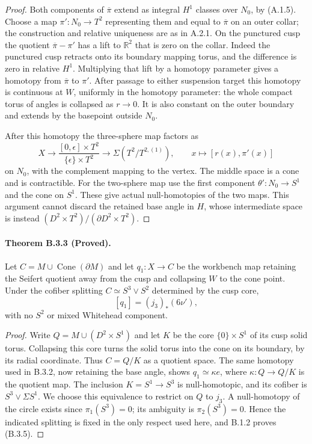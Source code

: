 \begin{proof}
Both components of $\overline\pi$ extend as integral
$H^1$ classes over $N_0$, by (A.1.5).  Choose a map
$\pi':N_0\to T^2$ representing them and equal to
$\overline\pi$ on an outer collar; the construction
and relative uniqueness are as in A.2.1.  On the
punctured cusp the quotient $\overline\pi-\pi'$ has
a lift to $\mathbb R^2$ that is zero on the collar.
Indeed the punctured cusp retracts onto its boundary
mapping torus, and the difference is zero in relative
$H^1$.  Multiplying that lift by a homotopy parameter
gives a homotopy from $\overline\pi$ to $\pi'$.
After passage to either suspension target this
homotopy is continuous at $W$, uniformly in the
homotopy parameter: the whole compact torus of
angles is collapsed as $r\to0$.  It is also constant
on the outer boundary and extends by the basepoint
outside $N_0$.

After this homotopy the three-sphere map factors as
\[
 X\longrightarrow
 \frac{[0,\epsilon]\times T^2}{\{\epsilon\}\times T^2}
 \longrightarrow\Sigma(T^2/T^{2,(1)}),
 \qquad x\longmapsto[r(x),\pi'(x)]
\]
on $N_0$, with the complement mapping to the vertex.
The middle space is a cone and is contractible.
For the two-sphere map use the first component
$\theta':N_0\to S^1$ and the cone on $S^1$.
These give actual null-homotopies of the two maps.
This argument cannot discard the retained base
angle in $H$, whose intermediate space is instead
$(D^2\times T^2)/(\partial D^2\times T^2)$.
\end{proof}

\paragraph{Theorem B.3.3 (Proved).}
Let $C=M\cup\operatorname{Cone}(\partial M)$ and let
$q_1:X\to C$ be the workbench map retaining the
Seifert quotient away from the cusp and collapsing
$W$ to the cone point.  Under the cofiber splitting
$C\simeq S^3\vee S^2$ determined by the cusp core,
\[
 [q_1]=(j_3)_*(6\nu'),
 \tag{B.3.5}
\]
with no $S^2$ or mixed Whitehead component.

\begin{proof}
Write $Q=M\cup(D^2\times S^1)$ and let $K$ be the
core $\{0\}\times S^1$ of its cusp solid torus.
Collapsing this core turns the solid torus into
the cone on its boundary, by its radial coordinate.
Thus $C=Q/K$ as a quotient space.  The same
homotopy used in B.3.2, now retaining the base angle,
shows $q_1\simeq\kappa e$, where $\kappa:Q\to Q/K$
is the quotient map.  The inclusion $K=S^1\to S^3$
is null-homotopic, and its cofiber is
$S^3\vee\Sigma S^1$.  We choose this equivalence
to restrict on $Q$ to $j_3$.  A null-homotopy of
the circle exists since $\pi_1(S^3)=0$; its
ambiguity is $\pi_2(S^3)=0$.  Hence the indicated
splitting is fixed in the only respect used here,
and B.1.2 proves (B.3.5).
\end{proof}

